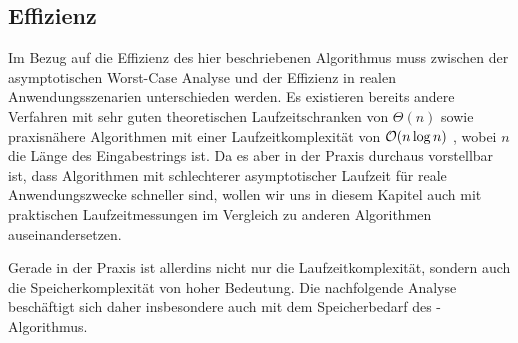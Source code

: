 \subsection{Effizienz}
\label{bpr:effizienz}

Im Bezug auf die Effizienz des hier beschriebenen Algorithmus muss zwischen der asymptotischen Worst-Case Analyse und der Effizienz in realen Anwendungsszenarien unterschieden werden. Es existieren bereits andere Verfahren mit sehr guten theoretischen Laufzeitschranken von \(\Theta(n)\) \cite{saca:9} sowie praxisnähere Algorithmen mit einer Laufzeitkomplexität von \(\mathcal{O}(n \log n)\) \cite{saca:1}, wobei \(n\) die Länge des Eingabestrings ist. Da es aber in der Praxis durchaus vorstellbar ist, dass Algorithmen mit schlechterer asymptotischer Laufzeit für reale Anwendungszwecke schneller sind, wollen wir uns in diesem Kapitel auch mit praktischen Laufzeitmessungen im Vergleich zu anderen Algorithmen auseinandersetzen.\par
Gerade in der Praxis ist allerdins nicht nur die Laufzeitkomplexität, sondern auch die Speicherkomplexität von hoher Bedeutung. Die nachfolgende Analyse beschäftigt sich daher insbesondere auch mit dem Speicherbedarf des \bpr-Algorithmus.




